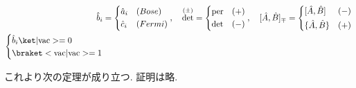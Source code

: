 \documentclass[uplatex,dvipdfmx,a4paper,11pt]{jlreq}
\DeclareMathOperator{\per}{per}
\DeclareMathOperator{\Det}{det}
\numberwithin{equation}{section}
\theoremstyle{definition}
\begin{document}
\begin{definition}
  \begin{align}
    \hat{b}_i & = \begin{dcases}
                    \hat{a}_i & (Bose)  \\
                    \hat{c}_i & (Fermi)
                  \end{dcases},\quad
    \Det^{(\pm)} = \begin{dcases}
                     \per & (+) \\
                     \Det & (-)
                   \end{dcases},\quad
    [\hat{A}, \hat{B}]_\mp = \begin{dcases}
                               [\hat{A}, \hat{B}]   & (-) \\
                               \{\hat{A}, \hat{B}\} & (+)
                             \end{dcases} \\
    \begin{dcases}
      \hat{b}_i\ket|\mathrm{vac}> = 0        \\
      \braket<\mathrm{vac}|\mathrm{vac}> = 1 \\
    \end{dcases}
  \end{align}
\end{definition}
これより次の定理が成り立つ. 証明は略.
\end{document}
